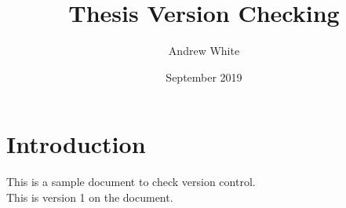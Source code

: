 \documentclass{article}
\title{Thesis Version Checking}
\author{Andrew White}
\date{September 2019}
\begin{document}
\maketitle

\section{Introduction}

This is a sample document to check version control.\\

This is version 1 on the document.
\end{document}
